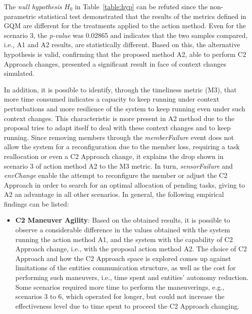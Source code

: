 The \emph{null hypothesis $H_0$} in Table~\ref{table:hyp} can be refuted since the non-parametric statistical test demonstrated that the results of the metrics defined in GQM are different for the treatments applied to the action method. Even for the scenario 3, the \textit{p-value} was 0.02865 and indicates that the two samples compared, i.e., A1 and A2 results, are statistically different. Based on this, the alternative hypothesis is valid, confirming that the proposed method A2, able to perform C2 Approach changes, presented a significant result in face of context changes simulated.

In addition, it is possible to identify, through the timeliness metric (M3), that more time consumed indicates a capacity to keep running under context perturbations and more resilience of the system to keep running even under such context changes. This characteristic is more present in A2 method due to the proposal tries to adapt itself to deal with these context changes and to keep running. Since removing members through the \emph{memberFailure} event does not allow the system for a reconfiguration due to the member loss, requiring a task reallocation or even a C2 Approach change, it explains the drop shown in scenario 3 of action method A2 to the M3 metric. In turn, \emph{sensorFailure} and \emph{envChange} enable the attempt to reconfigure the member or adjust the C2 Approach in order to search for an optimal allocation of pending tasks, giving to A2 an advantage in all other scenarios. In general, the following empirical findings can be listed:

\begin{itemize}
     \item \textbf{C2 Maneuver Agility}: Based on the obtained results, it is possible to observe a considerable difference in the values obtained with the system running the action method A1, and the system with the capability of C2 Approach change, i.e., with the proposal action method A2. The choice of C2 Approach and how the C2 Approach space is explored comes up against limitations of the entities communication structure, as well as the cost for performing such maneuvers, i.e., time spent and entities' autonomy reduction. Some scenarios required more time to perform the maneuverings, e.g., scenarios 3 to 6, which operated for longer, but could not increase the effectiveness level due to time spent to proceed the C2 Approach changing.
\end{itemize}

 


